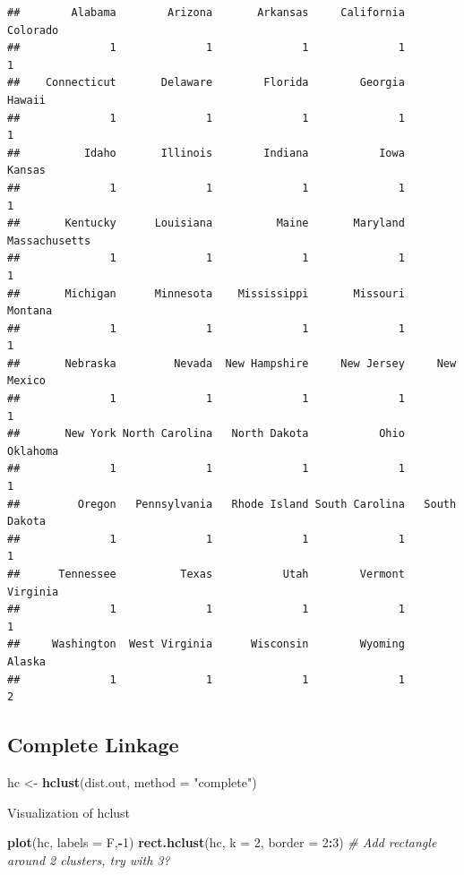 \documentclass[
]{book}
\newenvironment{Shaded}{\begin{snugshade}}{\end{snugshade}}
\newcommand{\CommentTok}[1]{\textcolor[rgb]{0.56,0.35,0.01}{\textit{#1}}}
\newcommand{\DataTypeTok}[1]{\textcolor[rgb]{0.13,0.29,0.53}{#1}}
\newcommand{\DecValTok}[1]{\textcolor[rgb]{0.00,0.00,0.81}{#1}}
\newcommand{\KeywordTok}[1]{\textcolor[rgb]{0.13,0.29,0.53}{\textbf{#1}}}
\newcommand{\NormalTok}[1]{#1}
\newcommand{\OperatorTok}[1]{\textcolor[rgb]{0.81,0.36,0.00}{\textbf{#1}}}
\newcommand{\StringTok}[1]{\textcolor[rgb]{0.31,0.60,0.02}{#1}}
\begin{document}
\begin{verbatim}
##        Alabama        Arizona       Arkansas     California       Colorado 
##              1              1              1              1              1 
##    Connecticut       Delaware        Florida        Georgia         Hawaii 
##              1              1              1              1              1 
##          Idaho       Illinois        Indiana           Iowa         Kansas 
##              1              1              1              1              1 
##       Kentucky      Louisiana          Maine       Maryland  Massachusetts 
##              1              1              1              1              1 
##       Michigan      Minnesota    Mississippi       Missouri        Montana 
##              1              1              1              1              1 
##       Nebraska         Nevada  New Hampshire     New Jersey     New Mexico 
##              1              1              1              1              1 
##       New York North Carolina   North Dakota           Ohio       Oklahoma 
##              1              1              1              1              1 
##         Oregon   Pennsylvania   Rhode Island South Carolina   South Dakota 
##              1              1              1              1              1 
##      Tennessee          Texas           Utah        Vermont       Virginia 
##              1              1              1              1              1 
##     Washington  West Virginia      Wisconsin        Wyoming         Alaska 
##              1              1              1              1              2
\end{verbatim}

\hypertarget{complete-linkage}{%
\subsection{Complete Linkage}\label{complete-linkage}}

\begin{Shaded}
\begin{Highlighting}[]
\NormalTok{hc <-}\StringTok{ }\KeywordTok{hclust}\NormalTok{(dist.out, }\DataTypeTok{method =} \StringTok{"complete"}\NormalTok{)}
\end{Highlighting}
\end{Shaded}

Visualization of hclust

\begin{Shaded}
\begin{Highlighting}[]
\KeywordTok{plot}\NormalTok{(hc, }\DataTypeTok{labels =}\NormalTok{ F,}\OperatorTok{-}\DecValTok{1}\NormalTok{)}
\KeywordTok{rect.hclust}\NormalTok{(hc, }\DataTypeTok{k =} \DecValTok{2}\NormalTok{, }\DataTypeTok{border =} \DecValTok{2}\OperatorTok{:}\DecValTok{3}\NormalTok{) }\CommentTok{# Add rectangle around 2 clusters, try with 3?}
\end{Highlighting}
\end{Shaded}
\end{document}
